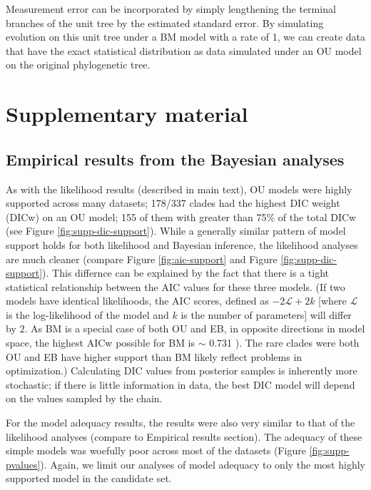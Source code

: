 \documentclass[a4paper,12pt]{article}
\begin{document}
Measurement error can be incorporated by simply lengthening the terminal branches of the unit tree by the estimated standard error. By simulating evolution on this unit tree under a BM model with a rate of 1, we can create data that have the exact statistical distribution as data simulated under an OU model on the original phylogenetic tree.


\newpage
\section{Supplementary material}
\subsection{Empirical results from the Bayesian analyses}
As with the likelihood results (described in main text), OU models were highly supported across many datasets; 
178/337 clades had the highest DIC weight (DICw) on an OU model; 155 of them with greater than 75\% of the total DICw (see Figure \ref{fig:supp-dic-support}). While a generally similar pattern of model support holds for both likelihood and Bayesian inference, the likelihood analyses are much cleaner (compare Figure \ref{fig:aic-support} and Figure \ref{fig:supp-dic-support}). This differnce can be explained by the fact that there is a tight statistical relationship between the AIC values for these three models. (If two models have identical likelihoods, the AIC scores, defined as $-2\mathcal{L} + 2k$ [where $\mathcal{L}$ is the log-likelihood of the model and $k$ is the number of parameters] will differ by $2$. As BM is a special case of both OU and EB, in opposite directions in model space, the highest AICw possible for BM is $\sim$ 0.731 \citep{SlaterPennell}). The rare clades were both OU and EB have higher support than BM likely reflect problems in optimization.) Calculating DIC values from posterior samples is inherently more stochastic; if there is little information in data, the best DIC model will depend on the values sampled by the chain. 

For the model adequacy results, the results were also very similar to that of the likelihood analyses (compare to Empirical results section). The adequacy of these simple models was woefully poor across most of the datasets (Figure \ref{fig:supp-pvalues}). Again, we limit our analyses of model adequacy to only the most highly supported model in the candidate set.
\end{document}
